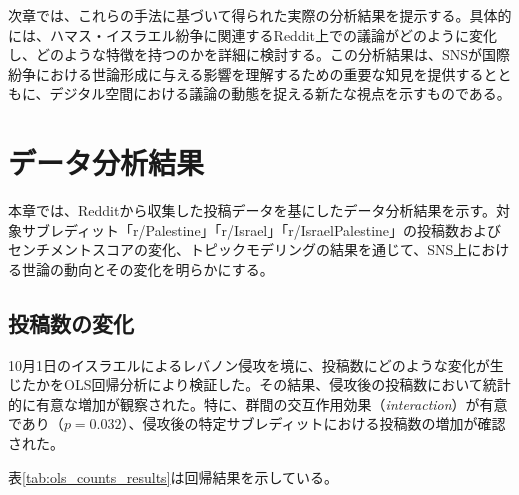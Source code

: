 \documentclass[11pt, a4j]{jreport}
\begin{document}
    次章では、これらの手法に基づいて得られた実際の分析結果を提示する。具体的には、ハマス・イスラエル紛争に関連するReddit上での議論がどのように変化し、どのような特徴を持つのかを詳細に検討する。この分析結果は、SNSが国際紛争における世論形成に与える影響を理解するための重要な知見を提供するとともに、デジタル空間における議論の動態を捉える新たな視点を示すものである。

    \chapter{データ分析結果}
    本章では、Redditから収集した投稿データを基にしたデータ分析結果を示す。対象サブレディット「r/Palestine」「r/Israel」「r/IsraelPalestine」の投稿数およびセンチメントスコアの変化、トピックモデリングの結果を通じて、SNS上における世論の動向とその変化を明らかにする。

    \section{投稿数の変化}
    10月1日のイスラエルによるレバノン侵攻を境に、投稿数にどのような変化が生じたかをOLS回帰分析により検証した。その結果、侵攻後の投稿数において統計的に有意な増加が観察された。特に、群間の交互作用効果（\textit{interaction}）が有意であり（$p = 0.032$）、侵攻後の特定サブレディットにおける投稿数の増加が確認された。

    表\ref{tab:ols_counts_results}は回帰結果を示している。

    \begin{table}[H]
        \centering
        \caption{投稿数の変化に関するOLS回帰結果}
        \label{tab:ols_counts_results}
    \end{table}
\end{document}
